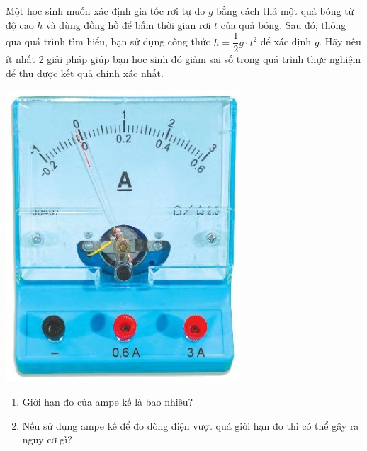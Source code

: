 \begin{ex}
	Một học sinh muốn xác định gia tốc rơi tự do $g$ bằng cách thả một quả bóng từ độ cao $h$ và dùng đồng hồ để bấm thời gian rơi $t$ của quả bóng. Sau đó, thông qua quá trình tìm hiểu, bạn sử dụng công thức $h=\dfrac{1}{2}g\cdot t^2$ để xác định $g$. Hãy nêu ít nhất 2 giải pháp giúp bạn học sinh đó giảm sai số trong quá trình thực nghiệm để thu được kết quả chính xác nhất.
\end{ex}

\begin{ex}
	\begin{center}
		\includegraphics[scale=0.6]{figs/G10Y25B2-3}
	\end{center}
	\begin{enumerate}[label=\alph*)]
		\item Giới hạn đo của ampe kế là bao nhiêu?
		\item Nếu sử dụng ampe kế để đo dòng điện vượt quá giới hạn đo thì có thể gây ra nguy cơ gì?
	\end{enumerate}
\end{ex}

